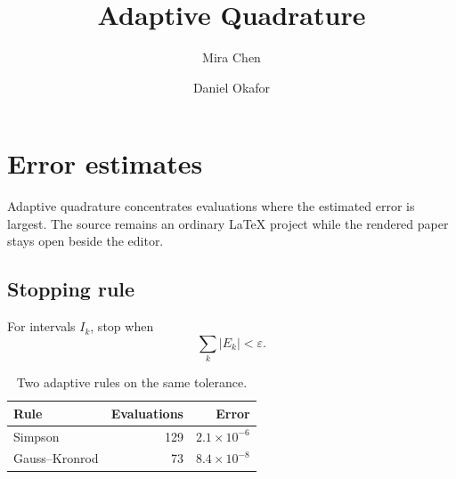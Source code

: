 \documentclass[11pt]{article}
\title{Adaptive Quadrature}
\author{Mira Chen \and Daniel Okafor}
\date{}
\begin{document}
\maketitle

\section{Error estimates}

Adaptive quadrature concentrates evaluations where the estimated error is
largest. The source remains an ordinary \LaTeX{} project while the rendered
paper stays open beside the editor.

\subsection{Stopping rule}

For intervals $I_k$, stop when
\[
  \sum_k \lvert E_k \rvert < \varepsilon.
\]

\begin{table}[h]
  \centering
  \begin{tabular}{lrr}
    \toprule
    Rule & Evaluations & Error \\
    \midrule
    Simpson & 129 & $2.1\times10^{-6}$ \\
    Gauss--Kronrod & 73 & $8.4\times10^{-8}$ \\
    \bottomrule
  \end{tabular}
  \caption{Two adaptive rules on the same tolerance.}
\end{table}
\end{document}
